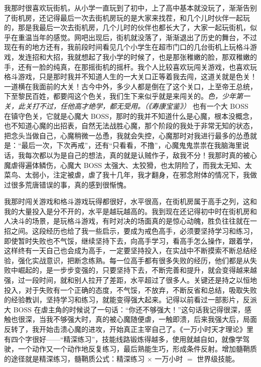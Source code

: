 我那时很喜欢玩街机，从小学一直玩到了初中，上了高中基本就没玩了，渐渐告别了街机房，还记得最后一次去街机房玩的是大家来找茬，和几个儿时伙伴一起玩的，那是我最后一次去街机房，几个儿时的伙伴也都长大了，大家一起玩街机，似乎在重温当年的感觉。网吧出现后，街机就没落了，渐渐退出了历史的舞台，不过现在有的地方还有，我前段时间看见几个小学生在超市门口的几台街机上玩格斗游戏，发连招和大招，我就想起了我小学的时候了，也是那张稚嫩的脸，那双稚嫩的手，还有一脸的纯真，在那摇街机的摇杆。我个人比较喜欢玩闯关游戏，也喜欢玩格斗游戏，只是那时我并不知道人生的一大关口正等着我去闯，这道关就是色关！一道横在我面前的大关！古今中外，多少人都是倒在了这个关口，上至帝王总统，下至黎民百姓，都要闯这个色关，我们生下来似乎就是来闯关的。\textit{色，少年第一关，此关打不过，任他高才绝学，都无受用。（《寿康宝鉴》）} 也有一个大 BOSS 在镇守色关，它就是心魔大 BOSS，那时的我并不知道什么是心魔，根本没概念，也不知道心魔的出招表，自然无法战胜心魔，那个阶段的我处于非常无知的状态，把念头当做自己，心魔稍微一怂恿，我就会失控，心魔那时对我进行最多的怂恿就是：“最后一次，下次再戒”，还有“只看看，不撸”，心魔鬼鬼祟祟在我脑海里说话，我每次都以为是自己的想法，真的就是认贼作子，敌我不分！我那时真的被心魔虐得遍体鳞伤，心魔大 BOSS 太强大、太狡猾，也太阴险了，而我太无知、太菜鸟、太弱小，注定被虐，虐了我十几年，我才翻身，在邪念附体的情况下，我做过很多荒唐错误的事，真的感到很惭愧。

我那时闯关游戏和格斗游戏玩得都很好，水平很高，在街机房属于高手之列，这和我的大量投入是分不开的，水平是越玩越高的。我到现在还记得初中时在街机房和人决斗的场景，是玩格斗游戏，有时对决的场面真的是惊心动魄，胜负往往就在一招之间。这段经历也给了我一些启示，要成为戒色高手，必须要坚持学习和练习，即使暂时失败也不气馁，继续坚持下去，向高手学习，看高手怎么操作，跟着学，这样终有一天自己也会成为高手，一定要坚持投入，在实战中不断摸索不断总结经验，强化实战意识，把断念练熟。每一位高手都有很多失败的经历，他们都是从失败中崛起的，是一步步变强的，只要坚持下去，不断完善和提升，就会变得越来越强，过一段时间，就和别人拉开了差距，水平超过了很多人。关键还是持之以恒地投入，对于失败有一个正确的态度，不气馁，不放弃，不断反省和总结，吸取失败的经验教训，坚持学习和练习，就能变得强大起来。记得以前看过一部影片，反派大 BOSS 在虐主角的时候说了一句话：“你还不够强大！”这句话我记得很深，感触也很深，当我不够强大时，真的被心魔随便虐，一触即溃，后来我强大后，局面反转了，我开始击溃心魔的进攻，开始真正主宰自己了。《一万小时天才理论》里有四个字很好——“精深练习”，技能线路锻炼得越多，使用就越自如，就像学驾驶，一个动作又一个动作地反复练习，最后熟能生巧，形成条件反射。增加髓鞘质的途径就是精深练习，髓鞘质公式：精深练习 $\times$ 一万小时 $=$ 世界级技能。

